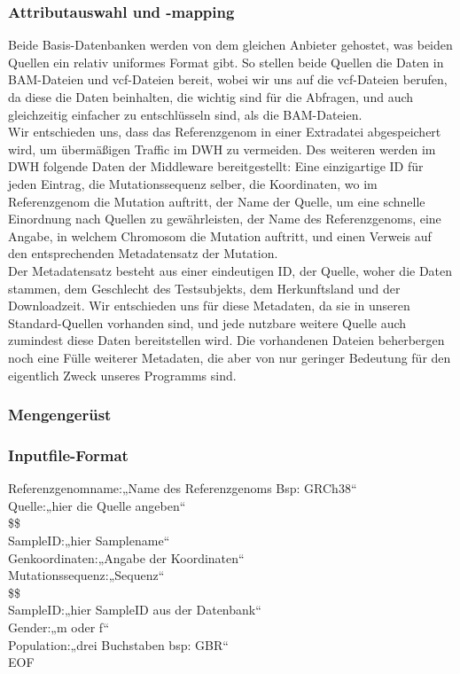 \subsubsection{Attributauswahl und -mapping}
Beide Basis-Datenbanken werden von dem gleichen Anbieter gehostet, was beiden Quellen ein relativ uniformes Format gibt. So stellen beide Quellen die Daten in BAM-Dateien und vcf-Dateien bereit, wobei wir uns auf die vcf-Dateien berufen, da diese die Daten beinhalten, die wichtig sind für die Abfragen, und auch gleichzeitig einfacher zu entschlüsseln sind, als die BAM-Dateien.\\
Wir entschieden uns, dass das Referenzgenom in einer Extradatei abgespeichert wird, um übermäßigen Traffic im DWH zu vermeiden. Des weiteren werden im DWH folgende Daten der Middleware bereitgestellt: Eine einzigartige ID für jeden Eintrag, die Mutationssequenz selber, die Koordinaten, wo im Referenzgenom die Mutation auftritt, der Name der Quelle, um eine schnelle Einordnung nach Quellen zu gewährleisten, der Name des Referenzgenoms, eine Angabe, in welchem Chromosom die Mutation auftritt, und einen Verweis auf den entsprechenden Metadatensatz der Mutation.\\
Der Metadatensatz besteht aus einer eindeutigen ID, der Quelle, woher die Daten stammen, dem Geschlecht des Testsubjekts, dem Herkunftsland und der Downloadzeit. Wir entschieden uns für diese Metadaten, da sie in unseren Standard-Quellen vorhanden sind, und jede nutzbare weitere Quelle auch zumindest diese Daten bereitstellen wird. Die vorhandenen Dateien beherbergen noch eine Fülle weiterer Metadaten, die aber von nur geringer Bedeutung für den eigentlich Zweck unseres Programms sind. 
\subsubsection{Mengengerüst}







\subsubsection{Inputfile-Format}
Referenzgenomname:„Name des Referenzgenoms Bsp: GRCh38“\\
Quelle:„hier die Quelle angeben“\\
\$\$\\
SampleID:„hier Samplename“\\
Genkoordinaten:„Angabe der Koordinaten“ \\
Mutationssequenz:„Sequenz“\\
\$\$\\
SampleID:„hier SampleID aus der Datenbank“\\
Gender:„m oder f“\\
Population:„drei Buchstaben bsp: GBR“ \\
EOF\\
